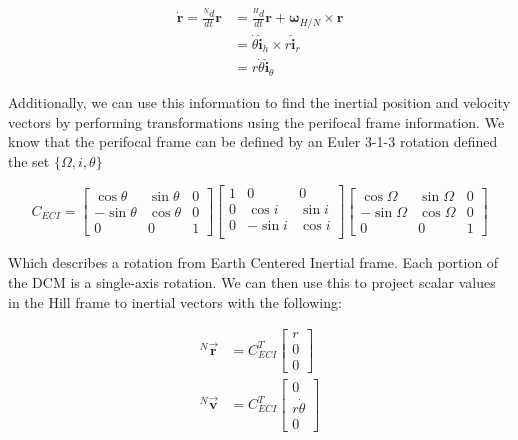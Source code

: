 \documentclass[paper]{aiaaNew}
\begin{document}
\begin{align}
	\dot{\bm{r}} = \frac{^N d}{dt}\bm{r} &= \frac{^H d}{dt}\bm{r} + \bm{\omega}_{H/N} \times \bm{r} \\
	&= \dot{\theta}\bm{\hat{i}}_h \times r\bm{\hat{i}}_r \\
	&= r\dot{\theta} \bm{\hat{i}}_\theta
\end{align}

Additionally, we can use this information to find the inertial position and velocity vectors by performing transformations using the perifocal frame information. We know that the perifocal frame can be defined by an Euler 3-1-3 rotation defined the set $\{\Omega, i, \theta \}$

\begin{equation}
C_{ECI} = 
\begin{bmatrix}
\cos{\theta} & \sin{\theta} & 0 \\
-\sin{\theta} & \cos{\theta} & 0 \\
0 & 0 & 1 
\end{bmatrix}
\begin{bmatrix}
1 & 0 & 0 \\
0 & \cos{i} & \sin{i} \\
0 & -\sin{i} & \cos{i} \\
\end{bmatrix}
\begin{bmatrix}
\cos{\Omega} & \sin{\Omega} & 0 \\
-\sin{\Omega} & \cos{\Omega} & 0 \\
0 & 0 & 1 
\end{bmatrix}
\end{equation}

Which describes a rotation from Earth Centered Inertial frame. Each portion of the DCM is a single-axis rotation. We can then use this to project scalar values in the Hill frame to inertial vectors with the following:

\begin{align}
  ^N\vec{\bm{r}} &= C_{ECI}^T 
  \begin{bmatrix}
  r \\ 0 \\ 0
  \end{bmatrix} \\
  ^N\vec{\bm{v}} &= C_{ECI}^T
  \begin{bmatrix}
  0 \\ r\dot{\theta} \\ 0
  \end{bmatrix}
\end{align}
\end{document}

